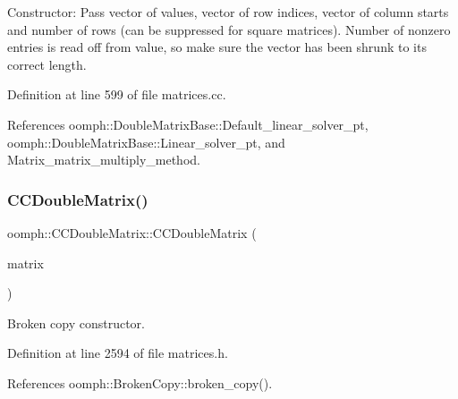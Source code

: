 Constructor\+: Pass vector of values, vector of row indices, vector of column starts and number of rows (can be suppressed for square matrices). Number of nonzero entries is read off from value, so make sure the vector has been shrunk to its correct length. 



Definition at line 599 of file matrices.\+cc.



References oomph\+::\+Double\+Matrix\+Base\+::\+Default\+\_\+linear\+\_\+solver\+\_\+pt, oomph\+::\+Double\+Matrix\+Base\+::\+Linear\+\_\+solver\+\_\+pt, and Matrix\+\_\+matrix\+\_\+multiply\+\_\+method.

\mbox{\label{classoomph_1_1CCDoubleMatrix_a98d894f76da33c507c6d7368b13a4fb6}} 
\subsubsection{\texorpdfstring{C\+C\+Double\+Matrix()}{CCDoubleMatrix()}\hspace{0.1cm}{\footnotesize\ttfamily [3/3]}}
{\footnotesize\ttfamily oomph\+::\+C\+C\+Double\+Matrix\+::\+C\+C\+Double\+Matrix (\begin{DoxyParamCaption}\item[{const \hyperlink{classoomph_1_1CCDoubleMatrix}{C\+C\+Double\+Matrix} \&}]{matrix }\end{DoxyParamCaption})\hspace{0.3cm}{\ttfamily [inline]}}



Broken copy constructor. 



Definition at line 2594 of file matrices.\+h.



References oomph\+::\+Broken\+Copy\+::broken\+\_\+copy().

\mbox{\label{classoomph_1_1CCDoubleMatrix_a89019bdd7b9a64a2f32cd4efa07fe45c}} 
